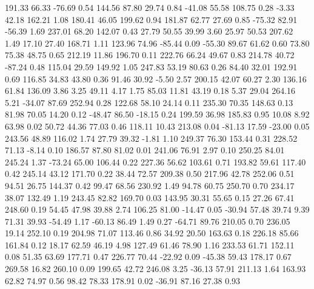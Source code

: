   191.33   66.33  -76.69    0.54
  144.56   87.80   29.74    0.84
  -41.08   55.58  108.75    0.28
   -3.33   42.18  162.21    1.08
  180.41   46.05  199.62    0.94
  181.87   62.77   27.69    0.85
  -75.32   82.91  -56.39    1.69
  237.01   68.20  142.07    0.43
   27.79   50.55   39.99    3.60
   25.97   50.53  207.62    1.49
   17.10   27.40  168.71    1.11
  123.96   74.96  -85.44    0.09
  -55.30   89.67   61.62    0.60
   73.80   75.38   48.75    0.65
  212.19   11.86  196.70    0.11
  222.76   66.24   49.67    0.83
  214.78   40.72  -87.24    0.48
  115.04   29.59  149.92    1.05
  247.83   53.19   80.63    0.26
   84.40   32.01  192.91    0.69
  116.85   34.83   43.80    0.36
   91.46   30.92   -5.50    2.57
  200.15   42.07   60.27    2.30
  136.16   61.84  136.09    3.86
    3.25   49.11    4.17    1.75
   85.03   11.81   43.19    0.18
    5.37   29.04  264.16    5.21
  -34.07   87.69  252.94    0.28
  122.68   58.10   24.14    0.11
  235.30   70.35  148.63    0.13
   81.98   70.05   14.20    0.12
  -48.47   86.50  -18.15    0.24
  199.59   36.98  185.83    0.95
   10.08    8.92   63.98    0.02
   50.72   44.36   77.03    0.46
  118.11   10.43  213.08    0.04
  -81.13   17.59  -23.00    0.05
  243.56   48.89  116.02    1.74
   27.79   39.32   -1.81    1.10
  249.37   76.30  153.44    0.31
  228.52   71.13   -8.14    0.10
  186.57   87.80   81.02    0.01
  241.06   76.91    2.97    0.10
  250.25   84.01  245.24    1.37
  -73.24   65.00  106.44    0.22
  227.36   56.62  103.61    0.71
  193.82   59.61  117.40    0.42
  245.14   43.12  171.70    0.22
   38.44   72.57  209.38    0.50
  217.96   42.78  252.06    0.51
   94.51   26.75  144.37    0.42
   99.47   68.56  230.92    1.49
   94.78   60.75  250.70    0.70
  234.17   38.07  132.49    1.19
  243.45   82.82  169.70    0.03
  143.95   30.31   55.65    0.15
   27.26   67.41  248.60    0.19
   54.45   47.98   39.88    2.74
  106.25   81.00  -14.47    0.05
  -30.94   57.48   39.74    9.39
   71.31   39.93  -54.49    1.17
  -60.13   86.49    1.49    0.27
  -64.71   89.76  210.05    0.70
  236.05   19.14  252.10    0.19
  204.98   71.07  113.46    0.86
   34.92   20.50  163.63    0.18
  226.18   85.66  161.84    0.12
   18.17   62.59   46.19    4.98
  127.49   61.46   78.90    1.16
  233.53   61.71  152.11    0.08
   51.35   63.69  177.71    0.47
  226.77   70.44  -22.92    0.09
  -45.38   59.43  178.17    0.67
  269.58   16.82  260.10    0.09
  199.65   42.72  246.08    3.25
  -36.13   57.91  211.13    1.64
  163.93   62.82   74.97    0.56
   98.42   78.33  178.91    0.02
  -36.91   87.16   27.38    0.93
